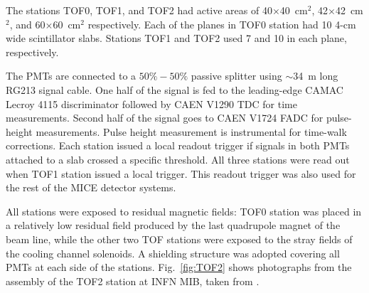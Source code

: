 The stations TOF0, TOF1, and TOF2 had active areas of
40$\times$40~cm$^2$, 42$\times$42~cm$^2$, and 60$\times$60~cm$^2$
respectively.  Each of the planes in TOF0 station had 10 4-cm wide
scintillator slabs. Stations TOF1 and TOF2 used 7 and
10 in each plane, respectively.

The PMTs are connected to a $50\%-50\%$ passive splitter using
$\sim$34~m long RG213 signal cable. One half of the signal is fed to
the leading-edge CAMAC Lecroy 4115 discriminator followed by CAEN
V1290 TDC for time measurements. Second half of the signal goes to
CAEN V1724 FADC for pulse-height measurements. Pulse height
measurement is instrumental for time-walk corrections. Each station
issued a local readout trigger if signals in both PMTs attached to a
slab crossed a specific threshold. All three stations were read out when
TOF1 station issued a local trigger. This readout trigger was also
used for the rest of the MICE detector systems.




All stations were exposed to residual magnetic fields: TOF0 station was placed in a relatively low residual field produced by the last quadrupole magnet of the beam line, while the other two TOF stations were exposed to the stray fields of the cooling channel solenoids. A shielding structure was adopted covering all PMTs at each side of the stations. Fig.~\ref{fig:TOF2} shows photographs from the assembly of the TOF2 station at INFN MIB, taken from \cite{NOTE286}.


